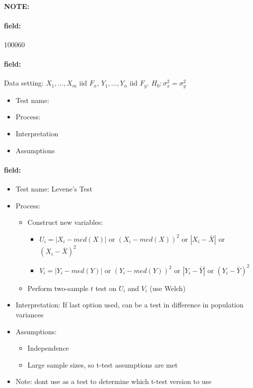 \documentclass[12pt]{article}
\newenvironment{note}{\paragraph{NOTE:}}{}
\newenvironment{field}{\paragraph{field:}}{}
\begin{document}
\begin{note} \begin{field} \tiny 100060 \end{field}
 \begin{field}
  Data setting: $X_1, \ldots , X_m$ iid $F_x$, $Y_1, \ldots, Y_n$ iid $F_y$. $H_0: \sigma_x^2 = \sigma_y^2$
  \begin{itemize}
   \item Test name:
   \item Process:
   \item Interpretation
   \item Assumptions
  \end{itemize}
 \end{field}
 \begin{field}
  \begin{itemize}
   \item Test name: Levene's Test
   \item Process:
         \begin{itemize}
          \item Construct new variables:
                \begin{itemize}
                 \item $U_i = |X_i - med(X)|$ or $(X_i - med(X))^2$ or $|X_i - \bar{X}|$ or $(X_i - \bar{X})^2$
                 \item $V_i = |Y_i - med(Y)|$ or $(Y_i - med(Y))^2$ or $|Y_i - \bar{Y}|$ or $(Y_i - \bar{Y})^2$
                \end{itemize}
          \item Perform two-sample $t$ test on $U_i$ and $V_i$ (use Welch)
         \end{itemize}
   \item Interpretation: If last option used, can be a test in difference in population variances
   \item Assumptions:
         \begin{itemize}
          \item Independence
          \item Large sample sizes, so t-test assumptions are met
         \end{itemize}
   \item Note: dont use as a test to determine which t-test version to use
  \end{itemize}
 \end{field}
\end{note}
\end{document}

